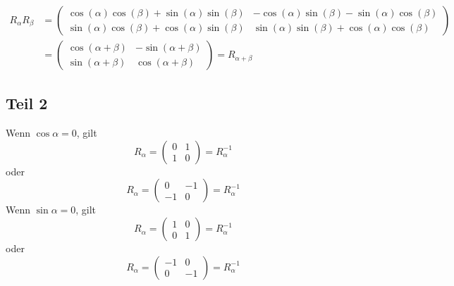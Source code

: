 \documentclass[a4paper,10pt]{article}
\begin{document}
\begin{align*}
 R_\alpha R_\beta & =
 \begin{pmatrix}
  \cos(\alpha)\cos(\beta) + \sin(\alpha)\sin(\beta) & -\cos(\alpha)\sin(\beta) - \sin(\alpha)\cos(\beta)\\
  \sin(\alpha)\cos(\beta) + \cos(\alpha)\sin(\beta) & \sin(\alpha)\sin(\beta) + \cos(\alpha)\cos(\beta)
 \end{pmatrix}\\
 & =
 \begin{pmatrix}
  \cos(\alpha + \beta) & -\sin(\alpha + \beta)\\
  \sin(\alpha + \beta) & \cos(\alpha + \beta)
 \end{pmatrix}
 = R_{\alpha + \beta}
\end{align*}

\subsection*{Teil 2}

Wenn $\cos \alpha = 0$, gilt
\begin{equation}
 R_\alpha =
 \begin{pmatrix}
  0 & 1\\
  1 & 0
 \end{pmatrix} = R_\alpha^{-1}
\end{equation}
oder
\begin{equation}
 R_\alpha =
 \begin{pmatrix}
  0 & -1\\
  -1 & 0
 \end{pmatrix} = R_\alpha^{-1}
\end{equation}
Wenn $\sin \alpha = 0$, gilt
\begin{equation}
 R_\alpha =
 \begin{pmatrix}
  1 & 0\\
  0 & 1
 \end{pmatrix} = R_\alpha^{-1}
\end{equation}
oder
\begin{equation}
 R_\alpha =
 \begin{pmatrix}
  -1 & 0\\
  0 & -1
 \end{pmatrix} = R_\alpha^{-1}
\end{equation}
\end{document}
